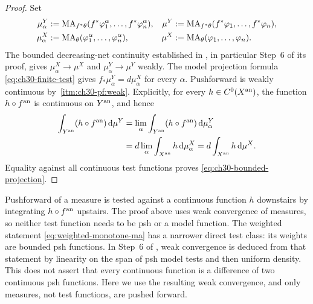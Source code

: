\begin{proof}
Set
\[
 \begin{aligned}
 \mu_\alpha^Y
   &:=\operatorname{MA}_{f^*\theta}(f^*\varphi_1^\alpha,\ldots,
      f^*\varphi_n^\alpha),&
 \mu^Y
   &:=\operatorname{MA}_{f^*\theta}(f^*\varphi_1,\ldots,f^*\varphi_n),\\
 \mu_\alpha^X
   &:=\operatorname{MA}_\theta(\varphi_1^\alpha,\ldots,\varphi_n^\alpha),&
 \mu^X
   &:=\operatorname{MA}_\theta(\varphi_1,\ldots,\varphi_n).
 \end{aligned}
\]
The bounded decreasing-net continuity established in
, in particular Step~6 of its proof,
gives \(\mu_\alpha^X\to\mu^X\) and \(\mu_\alpha^Y\to\mu^Y\) weakly.
The model projection formula \eqref{eq:ch30-finite-test} gives
\(f_*\mu_\alpha^Y=d\mu_\alpha^X\) for every \(\alpha\).
Pushforward is weakly continuous by
\,\cref{itm:ch30-pf:weak}.
Explicitly, for every \(h\in C^0(X^{\mathrm{an}})\), the function
\(h\circ f^{\mathrm{an}}\) is continuous on \(Y^{\mathrm{an}}\), and hence
\[
 \begin{aligned}
 \int_{Y^{\mathrm{an}}}(h\circ f^{\mathrm{an}})\,\mathrm d\mu^Y
 &=\lim_\alpha\int_{Y^{\mathrm{an}}}(h\circ f^{\mathrm{an}})\,\mathrm d\mu_\alpha^Y\\
 &=d\lim_\alpha\int_{X^{\mathrm{an}}}h\,\mathrm d\mu_\alpha^X
  =d\int_{X^{\mathrm{an}}}h\,\mathrm d\mu^X.
 \end{aligned}
\]
Equality against all continuous test functions proves
\eqref{eq:ch30-bounded-projection}.
\end{proof}

\begin{remark}
\label{rem:ch30-test-function}
Pushforward of a measure is tested against a continuous function \(h\)
downstairs by integrating \(h\circ f^{\mathrm{an}}\) upstairs.  The proof above
uses weak convergence of measures, so neither test function needs to be
psh or a model function.  The weighted statement
\eqref{eq:weighted-monotone-ma} has a narrower direct test class: its
weights are bounded psh functions.  In Step~6 of
, weak convergence is deduced from that
statement by linearity on the span of psh model tests and then uniform
density.  This does not assert that every continuous function is a
difference of two continuous psh functions.  Here we use the resulting
weak convergence, and only measures, not test functions, are pushed
forward.
\end{remark}
